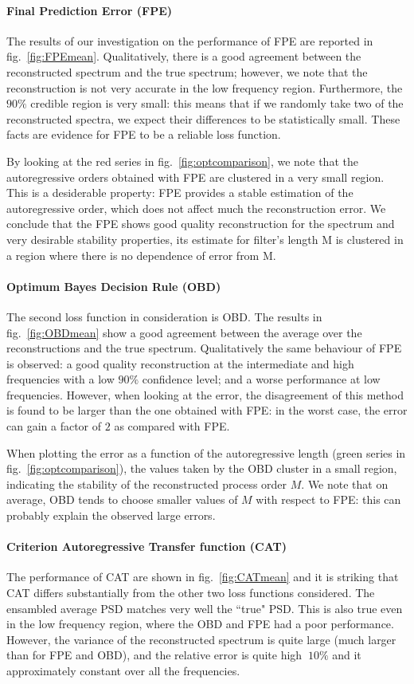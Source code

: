 \documentclass[twocolumn,showpacs,preprintnumbers,nofootinbib,prd,
superscriptaddress,10pt]{revtex4-1}
\begin{document}
\paragraph{Final Prediction Error (FPE)}
The results of our investigation on the performance of FPE are reported in fig.~\ref{fig:FPEmean}.
Qualitatively, there is a good agreement between the reconstructed spectrum and the true spectrum; however, we note that the reconstruction is not very accurate in the low frequency region. 
Furthermore, the $90\%$ credible region is very small: this means that if we randomly take two of the reconstructed spectra, we expect their differences to be statistically small.
These facts are evidence for FPE to be a reliable loss function.

By looking at the red series in fig.~\ref{fig:optcomparison}, we note that the autoregressive orders obtained with FPE are clustered in a very small region. This is a desiderable property: FPE provides a stable estimation of the autoregressive order, which does not affect much the reconstruction error.
We conclude that the FPE shows good quality reconstruction for the spectrum and very desirable stability properties, its estimate for filter's length M is clustered in a region where there is no dependence of error from M. 
\paragraph{Optimum Bayes Decision Rule (OBD)}
The second loss function in consideration is OBD.
The results in fig.~\ref{fig:OBDmean} show a good agreement between the average over the reconstructions and the true spectrum.
Qualitatively the same behaviour of FPE is observed: a good quality reconstruction at the intermediate and high frequencies with a low $90\%$ confidence level; and a worse performance at low frequencies.
However, when looking at the error, the disagreement of this method is found to be larger than the one obtained with FPE: in the worst case, the error can gain a factor of $2$ as compared with FPE. 

When plotting the error as a function of the autoregressive length (green series in fig.~\ref{fig:optcomparison}), the values taken by the OBD cluster in a small region, indicating the stability of the reconstructed process order $M$. We note that on average, OBD tends to choose smaller values of $M$ with respect to FPE: this can probably explain the observed large errors.

\paragraph{Criterion Autoregressive Transfer function (CAT)}
The performance of CAT are shown in fig.~\ref{fig:CATmean} and it is striking that CAT differs substantially from the other two loss functions considered.
The ensambled average PSD matches very well the ``true" PSD. This is also true even in the low frequency region, where the OBD and FPE had a poor performance.
However, the variance of the reconstructed spectrum is quite large (much larger than for FPE and OBD), and the relative error is quite high $~10\%$ and it approximately constant over all the frequencies.
\end{document}

